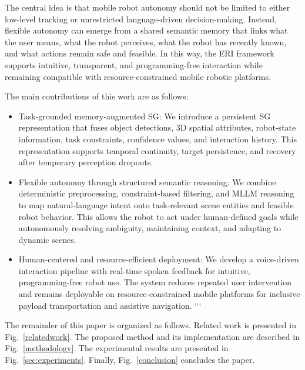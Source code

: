 \documentclass[lettersize,journal]{IEEEtran}
\begin{document}
The central idea is that mobile robot autonomy should not be limited to either low-level tracking or unrestricted language-driven decision-making. Instead, flexible autonomy can emerge from a shared semantic memory that links what the user means, what the robot perceives, what the robot has recently known, and what actions remain safe and feasible. In this way, the ERI framework supports intuitive, transparent, and programming-free interaction while remaining compatible with resource-constrained mobile robotic platforms.

The main contributions of this work are as follows:

\begin{itemize}
	\item Task-grounded memory-augmented SG:
	We introduce a persistent SG representation that fuses object detections, 3D spatial attributes, robot-state information, task constraints, confidence values, and interaction history. This representation supports temporal continuity, target persistence, and recovery after temporary perception dropouts.
	
	\item Flexible autonomy through structured semantic reasoning:
	We combine deterministic preprocessing, constraint-based filtering, and MLLM reasoning to map natural-language intent onto task-relevant scene entities and feasible robot behavior. This allows the robot to act under human-defined goals while autonomously resolving ambiguity, maintaining context, and adapting to dynamic scenes.
	
	\item Human-centered and resource-efficient deployment:
	We develop a voice-driven interaction pipeline with real-time spoken feedback for intuitive, programming-free robot use. The system reduces repeated user intervention and remains deployable on resource-constrained mobile platforms for inclusive payload transportation and assistive navigation.
	```
	
\end{itemize}

The remainder of this paper is organized as follows. Related work is presented in Fig.~\ref{relatedwork}. The proposed method and its implementation are described in Fig.~\ref{methodology}. The experimental results are presented in Fig.~\ref{sec:experiments}. Finally, Fig.~\ref{conclusion} concludes the paper.
\end{document}
